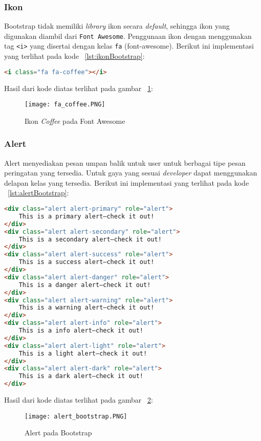 \subsubsection{Ikon}
Bootstrap tidak memiliki \textit{library} ikon secara \textit{default}, sehingga ikon yang digunakan diambil dari \texttt{Font Awesome}. Penggunaan ikon dengan menggunakan tag \texttt{<i>} yang disertai dengan kelas \texttt{fa} (font-awesome). Berikut ini implementasi yang terlihat pada kode ~\ref{lst:ikonBootstrap}:

\begin{lstlisting}[style=customhtml, language=HTML,  basicstyle=\ttfamily, frame=single, columns=fullflexible, keepspaces=true, breaklines=true, showstringspaces=false, label={lst:ikonBootstrap}, caption=Ikon pada bootstrap 4.]
<i class="fa fa-coffee"></i>
\end{lstlisting}

\noindent Hasil dari kode diatas terlihat pada gambar ~\ref{fig:fontAwesomeBootstrap}:
\begin{figure} [H]
	\centering  
	\texttt{[image: fa\_coffee.PNG]}  
	\caption{Ikon \textit{Coffee} pada Font Awesome} 
	\label{fig:fontAwesomeBootstrap}
\end{figure}

\subsubsection{Alert}
Alert menyediakan pesan umpan balik untuk user untuk berbagai tipe pesan peringatan yang tersedia. Untuk gaya yang sesuai \textit{developer} dapat menggunakan delapan kelas yang tersedia. Berikut ini implementasi yang terlihat pada kode ~\ref{lst:alertBootstrap}:

\begin{lstlisting}[style=customhtml, language=HTML,  basicstyle=\ttfamily, frame=single, columns=fullflexible, keepspaces=true, breaklines=true, showstringspaces=false, label={lst:alertBootstrap}, caption=Alert pada bootstrap 4.] 
<div class="alert alert-primary" role="alert">
	This is a primary alert—check it out!
</div>
<div class="alert alert-secondary" role="alert">
	This is a secondary alert—check it out!
</div>
<div class="alert alert-success" role="alert">
	This is a success alert—check it out!
</div>
<div class="alert alert-danger" role="alert">
	This is a danger alert—check it out!
</div>
<div class="alert alert-warning" role="alert">
	This is a warning alert—check it out!
</div>
<div class="alert alert-info" role="alert">
	This is a info alert—check it out!
</div>
<div class="alert alert-light" role="alert">
	This is a light alert—check it out!
</div>
<div class="alert alert-dark" role="alert">
	This is a dark alert—check it out!
</div>
\end{lstlisting}
\noindent Hasil dari kode diatas terlihat pada gambar ~\ref{fig:alertBootstrap}:
\begin{figure} [H]
	\centering  
	\texttt{[image: alert\_bootstrap.PNG]}  
	\caption{Alert pada Bootstrap} 
	\label{fig:alertBootstrap}
\end{figure}
